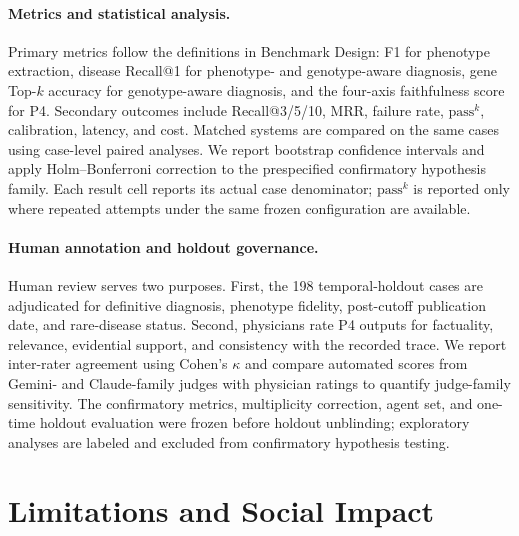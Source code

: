 \documentclass[letterpaper]{article} %
\begin{document}
\paragraph{Metrics and statistical analysis.}
Primary metrics follow the definitions in Benchmark Design: F1 for phenotype
extraction,
disease Recall@1 for phenotype- and genotype-aware diagnosis, gene Top-$k$
accuracy for genotype-aware diagnosis, and the four-axis faithfulness score
for P4. Secondary outcomes include Recall@3/5/10, MRR, failure rate,
$\mathrm{pass}^k$, calibration, latency, and cost. Matched systems are compared
on the same cases using case-level paired analyses. We report bootstrap
confidence intervals and apply Holm--Bonferroni correction to the
prespecified confirmatory hypothesis family. Each result cell reports its
actual case denominator; $\mathrm{pass}^k$ is reported only where repeated
attempts under the same frozen configuration are available.

\paragraph{Human annotation and holdout governance.}
\label{sec-5-4}
Human review serves two purposes. First, the 198 temporal-holdout cases are
adjudicated for definitive diagnosis, phenotype fidelity, post-cutoff
publication date, and rare-disease status. Second, physicians rate P4 outputs
for factuality, relevance, evidential support, and consistency with the
recorded trace. We report inter-rater agreement using Cohen's $\kappa$ and
compare automated scores from Gemini- and Claude-family judges with physician
ratings to quantify judge-family sensitivity. The confirmatory metrics, multiplicity correction,
agent set, and one-time holdout evaluation were frozen before holdout
unblinding; exploratory analyses are labeled and excluded from confirmatory
hypothesis testing.




\section{Limitations and Social Impact}
\label{sec-9}
\end{document}
